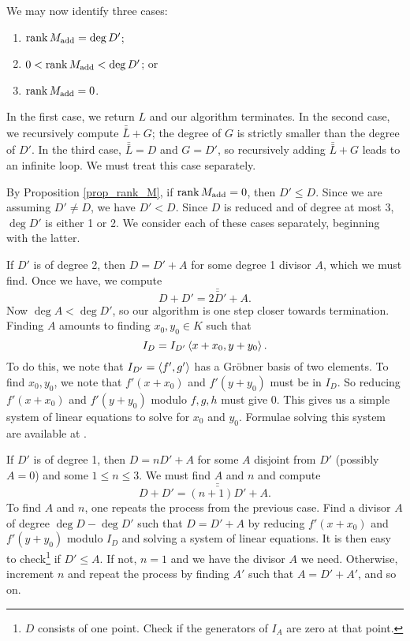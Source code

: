 We may now identify three cases:
\begin{enumerate}[label=(\roman*)]
  \item $\operatorname{rank} M_{\text{add}} = \deg D'$;
  \item $0 < \operatorname{rank} M_{\text{add}} < \deg D'$; or
  \item $\operatorname{rank} M_{\text{add}} = 0$.
\end{enumerate}
In the first case, we return $L$ and our algorithm terminates.
In the second case, we recursively compute $\bar{\bar L} + G$;
the degree of $G$ is strictly smaller than the degree of $D'$.
In the third case, $\bar{\bar L} = D$ and $G = D'$, so recursively adding $\bar{\bar L} + G$ leads to an infinite loop.
We must treat this case separately.

By Proposition \ref{prop_rank_M}, if $\operatorname{rank} M_{\text{add}} = 0$, then $D' \leq D$.
Since we are assuming $D' \neq D$, we have $D' < D$.
Since $D$ is reduced and of degree at most 3, $\deg D'$ is either 1 or 2.
We consider each of these cases separately, beginning with the latter.

If $D'$ is of degree 2, then $D = D' + A$ for some degree 1 divisor $A$, which we must find.
Once we have, we compute
  \[ D + D' = \bar{\bar{2D'}} + A. \]
Now $\deg A < \deg D'$, so our algorithm is one step closer towards termination.
Finding $A$ amounts to finding $x_0, y_0 \in K$ such that
  \[ I_D = I_{D'}\left\langle x + x_0, y + y_0 \right\rangle. \]
To do this, we note that $I_{D'} = \left\langle f',g' \right\rangle$ has a Gr\"obner basis of two elements.
To find $x_0, y_0$, we note that $f'(x + x_0)$ and $f'(y + y_0)$ must be in $I_D$.
So reducing $f'(x + x_0)$ and $f'(y + y_0)$ modulo $f, g, h$ must give 0.
This gives us a simple system of linear equations to solve for $x_0$ and $y_0$.
Formulae solving this system are available at \cite{github}.

If $D'$ is of degree 1, then $D = nD' + A$ for some $A$ disjoint from $D'$ (possibly $A = 0$)
and some $1 \leq n \leq 3$.
We must find $A$ and $n$ and compute
  \[ D + D' = \bar{\bar{(n + 1)D'}} + A. \]
To find $A$ and $n$, one repeats the process from the previous case.
Find a divisor $A$ of degree $\deg D - \deg D'$ such that $D = D' + A$
by reducing $f'(x + x_0)$ and $f'(y + y_0)$ modulo $I_D$ and solving a system of linear equations.
It is then easy to check\footnote{
$D$ consists of one point. Check if the generators of $I_A$ are zero at that point.}
if $D' \leq A$.
If not, $n = 1$ and we have the divisor $A$ we need.
Otherwise, increment $n$ and repeat the process by finding $A'$ such that $A = D' + A'$, and so on.

